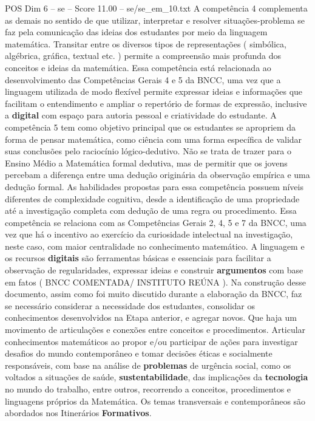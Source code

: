 \begin{textsample}{POS Dim 6 – se – Score 11.00 – se/se\_em\_10.txt}
A competência 4 complementa as demais no sentido de que utilizar, interpretar e resolver situações-problema se faz pela comunicação das ideias dos estudantes por meio da linguagem matemática.
Transitar entre os diversos tipos de representações ( simbólica, algébrica, gráfica, textual etc. ) permite a compreensão mais profunda dos conceitos e ideias da matemática.
Essa competência está relacionada ao desenvolvimento das Competências Gerais 4 e 5 da BNCC, uma vez que a linguagem utilizada de modo flexível permite expressar ideias e informações que facilitam o entendimento e ampliar o repertório de formas de expressão, inclusive a \textbf{digital} com espaço para autoria pessoal e criatividade do estudante.
A competência 5 tem como objetivo principal que os estudantes se apropriem da forma de pensar matemática, como ciência com uma forma específica de validar suas conclusões pelo raciocínio lógico-dedutivo.
Não se trata de trazer para o Ensino Médio a Matemática formal dedutiva, mas de permitir que os jovens percebam a diferença entre uma dedução originária da observação empírica e uma dedução formal.
As habilidades propostas para essa competência possuem níveis diferentes de complexidade cognitiva, desde a identificação de uma propriedade até a investigação completa com dedução de uma regra ou procedimento.
Essa competência se relaciona com as Competências Gerais 2, 4, 5 e 7 da BNCC, uma vez que há o incentivo ao exercício da curiosidade intelectual na investigação, neste caso, com maior centralidade no conhecimento matemático.
A linguagem e os recursos \textbf{digitais} são ferramentas básicas e essenciais para facilitar a observação de regularidades, expressar ideias e construir \textbf{argumentos} com base em fatos ( BNCC COMENTADA/ INSTITUTO REÚNA ).
Na construção desse documento, assim como foi muito discutido durante a elaboração da BNCC, faz se necessário considerar a necessidade dos estudantes, consolidar os conhecimentos desenvolvidos na Etapa anterior, e agregar novos.
Que haja um movimento de articulações e conexões entre conceitos e procedimentos.
Articular conhecimentos matemáticos ao propor e/ou participar de ações para investigar desafios do mundo contemporâneo e tomar decisões éticas e socialmente responsáveis, com base na análise de \textbf{problemas} de urgência social, como os voltados a situações de saúde, \textbf{sustentabilidade}, das implicações da \textbf{tecnologia} no mundo do trabalho, entre outros, recorrendo a conceitos, procedimentos e linguagens próprios da Matemática.
Os temas transversais e contemporâneos são abordados nos Itinerários \textbf{Formativos}.

\end{textsample}
